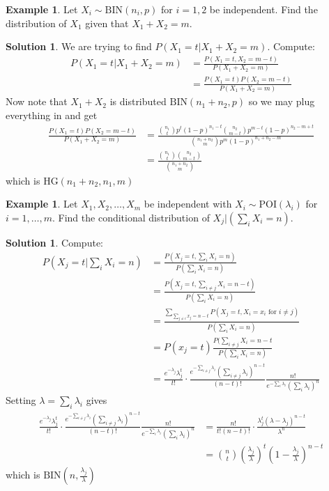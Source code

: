 \documentclass[11pt]{amsart}
\theoremstyle{definition}
\newtheorem{example}[theorem]{Example}
\newtheorem{solution}[theorem]{Solution}
\numberwithin{equation}{section}
\begin{document}
\begin{example}
    Let $X_i\sim\mathrm{BIN}(n_i,p)$ for $i=1,2$ be independent. Find the distribution of $X_1$ given that $X_1+X_2=m$.
\end{example}
\addtocounter{theorem}{-1}
\begin{solution}
    We are trying to find $P(X_1=t|X_1+X_2=m)$. Compute:
    \begin{align*}
        P(X_1=t|X_1+X_2=m)&=\frac{P(X_1=t,X_2=m-t)}{P(X_1+X_2=m)}\\
        &=\frac{P(X_1=t)P(X_2=m-t)}{P(X_1+X_2=m)}
    \end{align*}
    Now note that $X_1+X_2$ is distributed $\mathrm{BIN}(n_1+n_2,p)$ so we may plug everything in and get
    \begin{align*}
        \frac{P(X_1=t)P(X_2=m-t)}{P(X_1+X_2=m)}&=\frac{\binom{n_1}{t}p^t(1-p)^{n_1-t}\binom{n_2}{m-t}p^{m-t}(1-p)^{n_2-m+t}}{\binom{n_1+n_2}{m}p^m(1-p)^{n_1+n_2-m}}\\
        &=\frac{\binom{n_1}{t}\binom{n_2}{m-t}}{\binom{n_1+n_2}{m}}
    \end{align*}
    which is $\mathrm{HG}(n_1+n_2,n_1,m)$
\end{solution}
\begin{example}
    Let $X_1,X_2,\ldots,X_m$ be independent with $X_i\sim\mathrm{POI}(\lambda_i)$ for $i=1,\ldots,m$. Find the conditional distribution of $X_j|(\sum_iX_i=n)$.
\end{example}
\addtocounter{theorem}{-1}
\begin{solution}
    Compute:
    \begin{align*}
        P(X_j=t|\sum_{i}X_i=n)&=\frac{P(X_j=t,\sum_{i}X_i=n)}{P(\sum_iX_i=n)}\\
        &=\frac{P(X_j=t,\sum_{i\ne j}X_i=n-t)}{P(\sum_iX_i=n)}\\
        &=\frac{\sum_{\sum_{j\ne i}x_j=n-t}P(X_j=t,X_i=x_i\text{ for }i\ne j)}{P(\sum_iX_i=n)}\\
        &=P(x_j=t)\frac{P(\sum_{i\ne j}X_i=n-t}{P(\sum_iX_i=n)}\\
        &=\frac{e^{-\lambda_j}\lambda_j^t}{t!}\cdot\frac{e^{-\sum_{i\ne j}\lambda_i}(\sum_{i\ne j}\lambda_i)^{n-t}}{(n-t)!}\frac{n!}{e^{-\sum_i\lambda_i}(\sum_i\lambda_i)^n}
    \end{align*}
    Setting $\lambda=\sum_i\lambda_i$ gives
    \begin{align*}
        \frac{e^{-\lambda_j}\lambda_j^t}{t!}\cdot\frac{e^{-\sum_{i\ne j}\lambda_i}(\sum_{i\ne j}\lambda_i)^{n-t}}{(n-t)!}\frac{n!}{e^{-\sum_i\lambda_i}(\sum_i\lambda_i)^n}&=\frac{n!}{t!(n-t)!}\cdot\frac{\lambda_j^t(\lambda-\lambda_j)^{n-t}}{\lambda^n}\\
        &=\binom{n}{t}\left(\frac{\lambda_j}{\lambda}\right)^t\left(1-\frac{\lambda_j}{\lambda}\right)^{n-t}
    \end{align*}
    which is $\mathrm{BIN}(n,\frac{\lambda_j}{\lambda})$
\end{solution}
\end{document}
